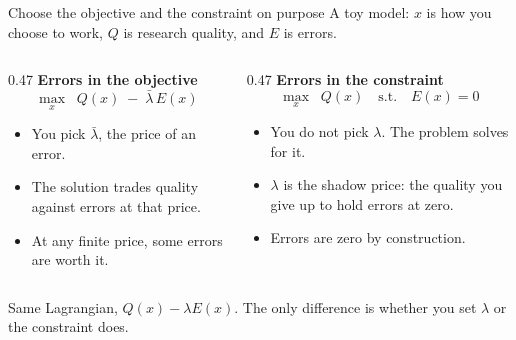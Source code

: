 \documentclass[aspectratio=169,11pt]{beamer}
\begin{document}
\begin{frame}{Choose the objective and the constraint on purpose}
\small\textcolor{warmgray}{A toy model: $x$ is how you choose to work, $Q$ is research quality, and $E$ is errors.}\normalsize

\begin{columns}[T]
\begin{column}{0.47\textwidth}
\textbf{Errors in the objective}
\[
\max_{x}\;\; Q(x) \;-\; \bar{\lambda}\,E(x)
\]
\begin{itemize}\setlength\itemsep{0.25em}
    \item You pick $\bar{\lambda}$, the price of an error.
    \item The solution trades quality against errors at that price.
    \item At any finite price, some errors are worth it.
\end{itemize}
\end{column}
\begin{column}{0.47\textwidth}
\textbf{Errors in the constraint}
\[
\max_{x}\;\; Q(x) \quad \text{s.t.} \quad E(x) = 0
\]
\begin{itemize}\setlength\itemsep{0.25em}
    \item You do not pick $\lambda$. The problem solves for it.
    \item $\lambda$ is the shadow price: the quality you give up to hold errors at zero.
    \item Errors are zero by construction.
\end{itemize}
\end{column}
\end{columns}

\vspace{0.4cm}

\alert{Same Lagrangian, $Q(x) - \lambda E(x)$. The only difference is whether you set $\lambda$ or the constraint does.}

\end{frame}
\end{document}
